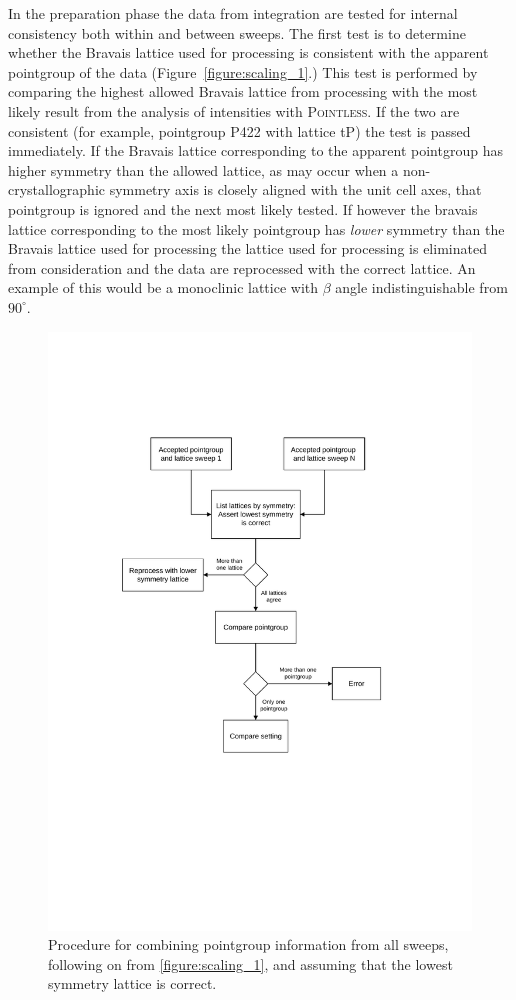 \documentclass[preprint,pdf]{iucr}
\begin{document}
In the preparation phase the data from integration are tested for
internal consistency both within and between sweeps. The first test is
to determine whether the Bravais lattice used for processing is
consistent with the apparent pointgroup of the data
(Figure~\ref{figure:scaling_1}.)
This test is performed by comparing the highest allowed Bravais
lattice from processing with the most likely result from 
the analysis of intensities with \textsc{Pointless}. If
the two are consistent (for example, pointgroup P422 with lattice tP)
the test is passed immediately. If the Bravais lattice corresponding
to the apparent pointgroup has higher
symmetry than the allowed lattice, as may occur when a
non-crystallographic symmetry axis is closely aligned with the unit cell
axes, that pointgroup is ignored and the next most likely tested. 
If
however the bravais lattice corresponding to the most likely pointgroup has 
\emph{lower} symmetry than the
Bravais lattice used for processing the lattice used for processing
is eliminated from
consideration and the data are reprocessed with the correct lattice.
An example of this would
be a monoclinic lattice with $\beta$ angle indistinguishable
from $90^{\circ}$. 

\begin{figure}
\caption{Procedure for combining pointgroup information from all
  sweeps, following on from \ref{figure:scaling_1}, and assuming that
  the lowest symmetry lattice is correct.
\label{figure:scaling_2}}
\centering
\includegraphics[scale=0.5]{figures/scaling-step-2.pdf}
\end{figure}
\end{document}
